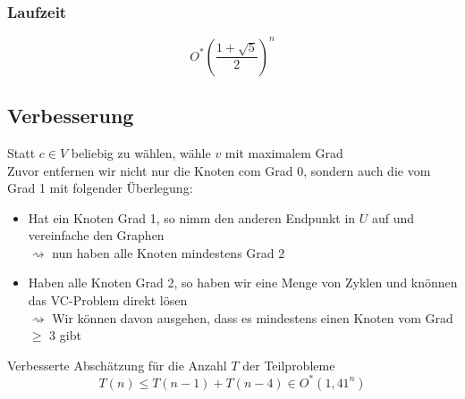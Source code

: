 \subsubsection{Laufzeit}
\[ O^*\left( \frac{1+\sqrt{5}}{2} \right)^n \]
\subsection{Verbesserung}
Statt $c\in V$ beliebig zu wählen, wähle $v$ mit maximalem Grad\\
Zuvor entfernen wir nicht nur die Knoten com Grad 0, sondern auch die vom Grad 1 mit folgender Überlegung:
\begin{figure}[H]
	\centering
\end{figure}
\begin{itemize}
	\item Hat ein Knoten Grad 1, so nimm den anderen Endpunkt in $U$ auf und vereinfache den Graphen\\
	$\rightsquigarrow$ nun haben alle Knoten mindestens Grad 2
	\item Haben alle Knoten Grad 2, so haben wir eine Menge von Zyklen und knönnen das VC-Problem direkt lösen\\
	$\rightsquigarrow$ Wir können davon ausgehen, dass es mindestens einen Knoten vom Grad $\geq$ 3 gibt
\end{itemize}
\begin{figure}[H]
	\centering
\end{figure}
Verbesserte Abschätzung für die Anzahl $T$ der Teilprobleme
\[ T(n) \leq T(n-1) + T(n-4) \in O^*(1,41^n)  \]
